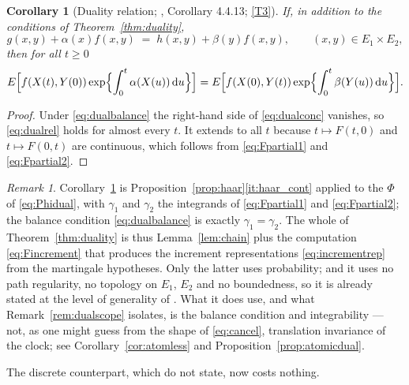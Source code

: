 \documentclass[11pt,a4paper]{article}
\theoremstyle{plain}
\newtheorem{corollary}[theorem]{Corollary}
\theoremstyle{definition}
\theoremstyle{remark}
\newtheorem{remark}[theorem]{Remark}
\newcommand{\dif}{\,\mathrm{d}}
\newcommand{\EK}{\cite{EK86}}
\newcommand{\CPS}{\cite{CPS23}}
\begin{document}
\begin{corollary}[Duality relation; \EK, Corollary 4.4.13; \eqref{T3}]
  \label{cor:dualrel}
  If, in addition to the conditions of Theorem~\ref{thm:duality},
  \begin{equation}
    \label{eq:dualbalance}
    g(x,y) + \alpha(x) f(x,y) \;=\; h(x,y) + \beta(y) f(x,y) ,
    \qquad (x,y) \in E_1 \times E_2 ,
  \end{equation}
  then for all $t \geq 0$
  \begin{equation}
    \label{eq:dualrel}
    E\Bigl[ f(X(t),Y(0)) \exp\Bigl\{ \int_0^t \alpha(X(u)) \dif u \Bigr\} \Bigr]
    = E\Bigl[ f(X(0),Y(t)) \exp\Bigl\{ \int_0^t \beta(Y(u)) \dif u \Bigr\} \Bigr].
  \end{equation}
\end{corollary}

\begin{proof}
  Under \eqref{eq:dualbalance} the right-hand side of \eqref{eq:dualconc}
  vanishes, so \eqref{eq:dualrel} holds for almost every $t$.  It extends to all
  $t$ because $t \mapsto F(t,0)$ and $t \mapsto F(0,t)$ are continuous, which
  follows from \eqref{eq:Fpartial1} and \eqref{eq:Fpartial2}.
\end{proof}

\begin{remark}
  \label{rem:dualischain}
  Corollary~\ref{cor:dualrel} is Proposition~\ref{prop:haar}\ref{it:haar_cont}
  applied to the $\Phi$ of \eqref{eq:Phidual}, with
  $\gamma_1$ and $\gamma_2$ the integrands of \eqref{eq:Fpartial1} and
  \eqref{eq:Fpartial2}; the balance condition \eqref{eq:dualbalance} is exactly
  $\gamma_1 = \gamma_2$.  The whole of Theorem~\ref{thm:duality} is thus
  Lemma~\ref{lem:chain} plus the computation \eqref{eq:Fincrement} that produces
  the increment representations \eqref{eq:incrementrep} from the martingale
  hypotheses.  Only the latter uses probability; and it uses no path regularity,
  no topology on $E_1$, $E_2$ and no boundedness, so it is already stated at the
  level of generality of \CPS.  What it does use, and what
  Remark~\ref{rem:dualscope} isolates, is the balance condition and
  integrability --- not, as one might guess from the shape of \eqref{eq:cancel},
  translation invariance of the clock; see Corollary~\ref{cor:atomless} and
  Proposition~\ref{prop:atomicdual}.
\end{remark}

The discrete counterpart, which \EK{} do not state, now costs nothing.
\end{document}
